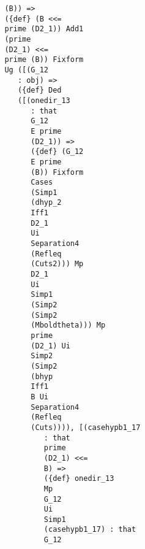 \documentclass[12pt]{article}
\begin{document}
\begin{verbatim}
                                  (B)) => 
                                  ({def} (B <<= 
                                  prime (D2_1)) Add1 
                                  (prime 
                                  (D2_1) <<= 
                                  prime (B)) Fixform 
                                  Ug ([(G_12 
                                     : obj) => 
                                     ({def} Ded 
                                     ([(onedir_13 
                                        : that 
                                        G_12 
                                        E prime 
                                        (D2_1)) => 
                                        ({def} (G_12 
                                        E prime 
                                        (B)) Fixform 
                                        Cases 
                                        (Simp1 
                                        (dhyp_2 
                                        Iff1 
                                        D2_1 
                                        Ui 
                                        Separation4 
                                        (Refleq 
                                        (Cuts2))) Mp 
                                        D2_1 
                                        Ui 
                                        Simp1 
                                        (Simp2 
                                        (Simp2 
                                        (Mboldtheta))) Mp 
                                        prime 
                                        (D2_1) Ui 
                                        Simp2 
                                        (Simp2 
                                        (bhyp 
                                        Iff1 
                                        B Ui 
                                        Separation4 
                                        (Refleq 
                                        (Cuts)))), [(casehypb1_17 
                                           : that 
                                           prime 
                                           (D2_1) <<= 
                                           B) => 
                                           ({def} onedir_13 
                                           Mp 
                                           G_12 
                                           Ui 
                                           Simp1 
                                           (casehypb1_17) : that 
                                           G_12 

\end{verbatim}
\end{document}
